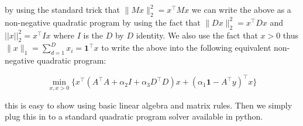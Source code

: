 \documentclass[10pt,a4paper]{article}
\begin{document}
by using the standard trick that $\| Mx\|^2_2 = x^\top M x$ we can write the above as a non-negative quadratic program by using the fact that $\| D x\|^2_2 = x^\top D x$ and $||x||_2^2 = x^\top I x$ where $I$ is the $D$ by $D$ identity. We also use the fact that $x>0$ thus $\| x \|_1 = \sum^D_{d=1} x_i = \boldsymbol{1}^\top x$ to write the above into the following equivalent non-negative quadratic program:

\begin{equation}
\min_{x,x>0} \Big\{ x^{\top}\left( A^\top A + \alpha_2 I + \alpha_3 D^\top D \right)x + (\alpha_1 \boldsymbol{1} - A^\top y)^\top x \Big\}
\end{equation}

this is easy to show using basic linear algebra and matrix rules. Then we simply plug this in to a standard quadratic program solver available in python.
\end{document}
